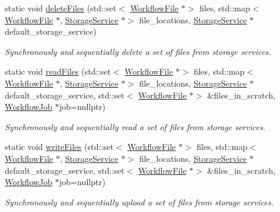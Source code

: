 \begin{DoxyCompactItemize}
\item 
static void \hyperlink{classwrench_1_1_storage_service_ae31dc70a721af8e0adaeaf0462ae0d4c}{delete\+Files} (std\+::set$<$ \hyperlink{classwrench_1_1_workflow_file}{Workflow\+File} $\ast$$>$ files, std\+::map$<$ \hyperlink{classwrench_1_1_workflow_file}{Workflow\+File} $\ast$, \hyperlink{classwrench_1_1_storage_service}{Storage\+Service} $\ast$$>$ file\+\_\+locations, \hyperlink{classwrench_1_1_storage_service}{Storage\+Service} $\ast$default\+\_\+storage\+\_\+service)
\begin{DoxyCompactList}\small\item\em Synchronously and sequentially delete a set of files from storage services. \end{DoxyCompactList}\item 
static void \hyperlink{classwrench_1_1_storage_service_a8623c6fdc91a7e698fa5019b0b329de4}{read\+Files} (std\+::set$<$ \hyperlink{classwrench_1_1_workflow_file}{Workflow\+File} $\ast$$>$ files, std\+::map$<$ \hyperlink{classwrench_1_1_workflow_file}{Workflow\+File} $\ast$, \hyperlink{classwrench_1_1_storage_service}{Storage\+Service} $\ast$$>$ file\+\_\+locations, \hyperlink{classwrench_1_1_storage_service}{Storage\+Service} $\ast$default\+\_\+storage\+\_\+service, std\+::set$<$ \hyperlink{classwrench_1_1_workflow_file}{Workflow\+File} $\ast$$>$ \&files\+\_\+in\+\_\+scratch, \hyperlink{classwrench_1_1_workflow_job}{Workflow\+Job} $\ast$job=nullptr)
\begin{DoxyCompactList}\small\item\em Synchronously and sequentially read a set of files from storage services. \end{DoxyCompactList}\item 
static void \hyperlink{classwrench_1_1_storage_service_a01359f369729358f030775ae0542bd5a}{write\+Files} (std\+::set$<$ \hyperlink{classwrench_1_1_workflow_file}{Workflow\+File} $\ast$$>$ files, std\+::map$<$ \hyperlink{classwrench_1_1_workflow_file}{Workflow\+File} $\ast$, \hyperlink{classwrench_1_1_storage_service}{Storage\+Service} $\ast$$>$ file\+\_\+locations, \hyperlink{classwrench_1_1_storage_service}{Storage\+Service} $\ast$default\+\_\+storage\+\_\+service, std\+::set$<$ \hyperlink{classwrench_1_1_workflow_file}{Workflow\+File} $\ast$$>$ \&files\+\_\+in\+\_\+scratch, \hyperlink{classwrench_1_1_workflow_job}{Workflow\+Job} $\ast$job=nullptr)
\begin{DoxyCompactList}\small\item\em Synchronously and sequentially upload a set of files from storage services. \end{DoxyCompactList}\end{DoxyCompactItemize}
